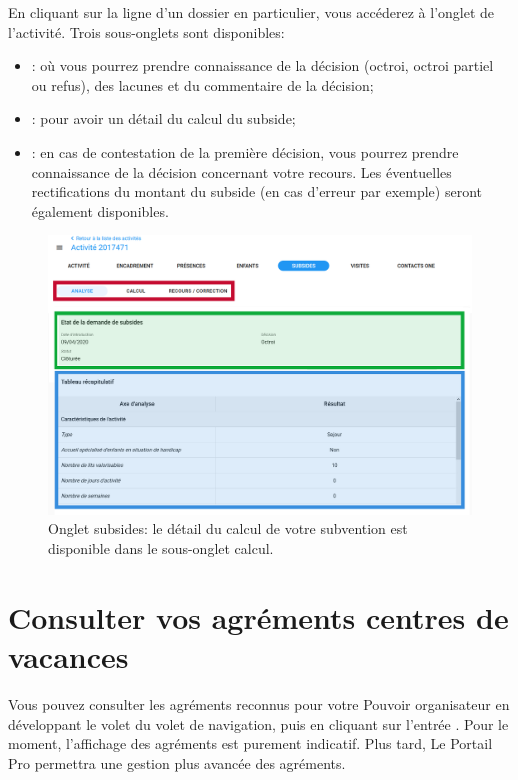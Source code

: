 En cliquant sur la ligne d'un dossier en particulier, vous accéderez à l'onglet  de l'activité. Trois sous-onglets sont disponibles: 

\begin{itemize}
    \item {}: où vous pourrez prendre connaissance de la décision (octroi, octroi partiel ou refus), des lacunes et du commentaire de la décision; 
    \item {}: pour avoir un détail du calcul du subside;
    \item {}: en cas de contestation de la première décision, vous pourrez prendre connaissance de la décision concernant votre recours. Les éventuelles rectifications du montant du subside (en cas d'erreur par exemple) seront également disponibles.
\end{itemize}

\begin{figure}[h]
    \centering
    \includegraphics[width=16cm]{Images/cdv/cdv-ds-details.png}
    \caption{Onglet subsides: le détail du calcul de votre subvention est disponible dans le sous-onglet calcul.}
    \label{fig:cdv_onglet_subsides}
\end{figure}


\section{Consulter vos agréments centres de vacances}
Vous pouvez consulter les agréments reconnus pour votre Pouvoir organisateur en développant le volet  du volet de navigation, puis en cliquant sur l'entrée . Pour le moment, l'affichage des agréments est purement indicatif. Plus tard, Le Portail Pro permettra une gestion plus avancée des agréments.